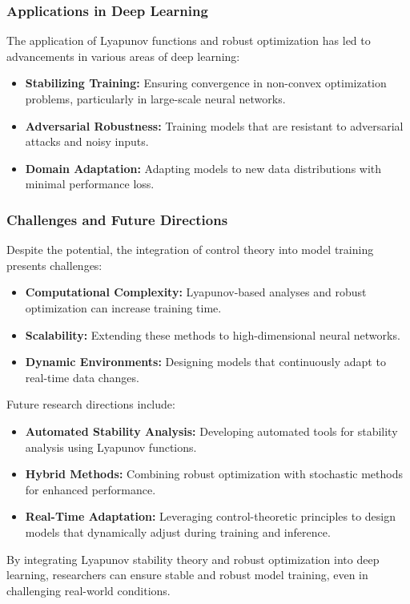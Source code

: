 \documentclass{IEEEojcsys}
\begin{document}
\subsubsection{Applications in Deep Learning}
The application of Lyapunov functions and robust optimization has led to advancements in various areas of deep learning:
\begin{itemize}
    \item \textbf{Stabilizing Training:} Ensuring convergence in non-convex optimization problems, particularly in large-scale neural networks.
    \item \textbf{Adversarial Robustness:} Training models that are resistant to adversarial attacks and noisy inputs.
    \item \textbf{Domain Adaptation:} Adapting models to new data distributions with minimal performance loss.
\end{itemize}

\subsubsection{Challenges and Future Directions}
Despite the potential, the integration of control theory into model training presents challenges:
\begin{itemize}
    \item \textbf{Computational Complexity:} Lyapunov-based analyses and robust optimization can increase training time.
    \item \textbf{Scalability:} Extending these methods to high-dimensional neural networks.
    \item \textbf{Dynamic Environments:} Designing models that continuously adapt to real-time data changes.
\end{itemize}

Future research directions include:
\begin{itemize}
    \item \textbf{Automated Stability Analysis:} Developing automated tools for stability analysis using Lyapunov functions.
    \item \textbf{Hybrid Methods:} Combining robust optimization with stochastic methods for enhanced performance.
    \item \textbf{Real-Time Adaptation:} Leveraging control-theoretic principles to design models that dynamically adjust during training and inference.
\end{itemize}

By integrating Lyapunov stability theory and robust optimization into deep learning, researchers can ensure stable and robust model training, even in challenging real-world conditions.
\end{document}
